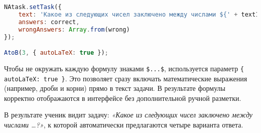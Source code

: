 \begin{lstlisting}[language=JavaScript]
NAtask.setTask({
    text: 'Какое из следующих чисел заключено между числами ${' + text1 + '}$ и ${' + text2 + '}$?',
    answers: correct,
    wrongAnswers: Array.from(wrong)
});

AtoB(3, { autoLaTeX: true });
\end{lstlisting}

Чтобы не окружать каждую формулу знаками \verb|$...$|, используется параметр \verb|{ autoLaTeX: true }|. 
Это позволяет сразу включать математические выражения (например, дроби и корни) прямо в текст задачи. 
В результате формулы корректно отображаются в интерфейсе без дополнительной ручной разметки.  

В результате ученик видит задачу: 
\textit{«Какое из следующих чисел заключено между числами …?»}, 
к которой автоматически предлагаются четыре варианта ответа.  

 
 
 
 
 
 
 
